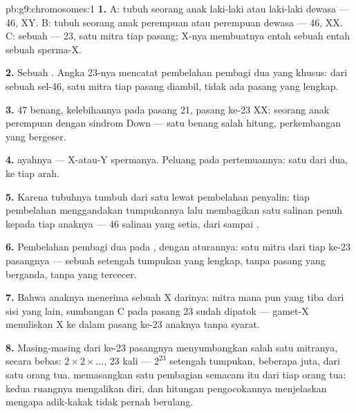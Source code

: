 \begin{solution}{pb:g9:chromosomes:1}
\textbf{1.} A:  tubuh seorang anak laki-laki atau
laki-laki dewasa --- 46, XY. B:  tubuh seorang anak
perempuan atau perempuan dewasa --- 46, XX. C: sebuah 
--- 23, satu mitra tiap pasang; X-nya membuatnya entah
sebuah  entah sebuah sperma-X.

\textbf{2.} Sebuah . Angka 23-nya mencatat pembelahan
pembagi dua yang khusus: dari sebuah sel-46, satu mitra tiap
pasang diambil, tidak ada pasang yang lengkap.

\textbf{3.} 47 benang, kelebihannya pada pasang 21, pasang
ke-23 XX:  seorang anak perempuan dengan sindrom
Down --- satu benang salah hitung, perkembangan yang bergeser.

\textbf{4.}  ayahnya --- X-atau-Y spermanya. Peluang
pada pertemuannya: satu dari dua, ke tiap arah.

\textbf{5.} Karena tubuhnya tumbuh dari satu  lewat
pembelahan penyalin: tiap pembelahan menggandakan
tumpukannya lalu membagikan satu salinan penuh kepada tiap
 anaknya --- 46 salinan yang setia, dari  sampai
.

\textbf{6.} Pembelahan pembagi dua pada , dengan
aturannya: satu mitra dari tiap ke-23 pasangnya --- sebuah
setengah tumpukan yang lengkap, tanpa pasang yang berganda,
tanpa yang tercecer.

\textbf{7.} Bahwa anaknya menerima sebuah X darinya: mitra
mana pun yang tiba dari sisi yang lain, sumbangan C pada
pasang 23 sudah dipatok --- gamet-X menuliskan X ke dalam
pasang ke-23 anaknya tanpa syarat.

\textbf{8.} Masing-masing dari ke-23 pasangnya menyumbangkan
salah satu mitranya, secara bebas: $2 \times 2 \times \dots$,
23 kali --- $2^{23}$ setengah tumpukan, beberapa juta, dari
satu orang tua.  memasangkan satu pembagian
semacam itu dari tiap orang tua: kedua ruangnya mengalikan
diri, dan hitungan pengocokannya menjelaskan mengapa
adik-kakak tidak pernah berulang.


\end{solution}
